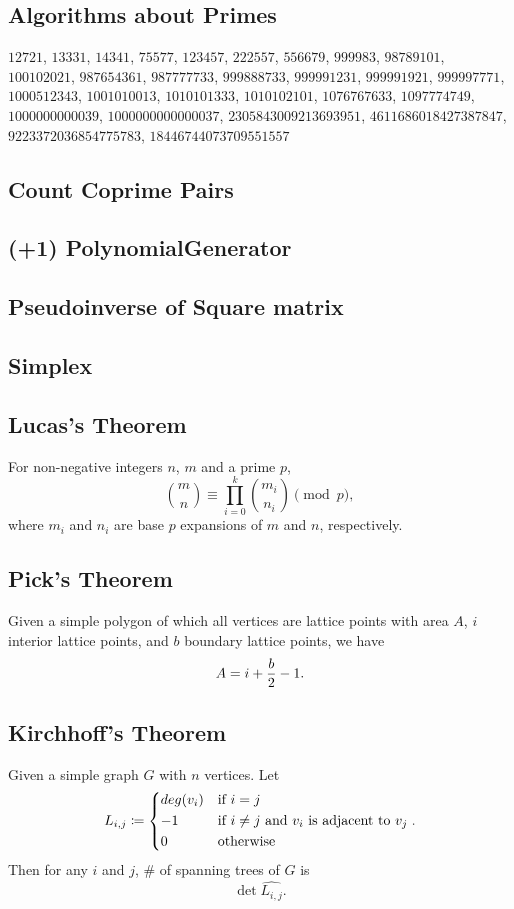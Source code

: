 \documentclass[a4paper,10pt,twocolumn,oneside]{article}
\begin{document}
\subsection{Algorithms about Primes}
$12721$,
$13331$,
$14341$,
$75577$,
$123457$,
$222557$,
$556679$,
$999983$,
$98789101$,
$100102021$,
$987654361$,
$987777733$,
$999888733$,
$999991231$,
$999991921$,
$999997771$,
$1000512343$,
$1001010013$,
$1010101333$,
$1010102101$,
$1076767633$,
$1097774749$,
$1000000000039$,
$1000000000000037$,
$2305843009213693951$,
$4611686018427387847$,
$9223372036854775783$,
$18446744073709551557$

\subsection{Count Coprime Pairs}

\subsection{(+1) PolynomialGenerator}

\subsection{Pseudoinverse of Square matrix}

\subsection{Simplex}


\subsection{Lucas's Theorem}
For non-negative integers $n$, $m$ and a prime $p$,
\[{m\choose n} \equiv \prod_{i=0}^{k}{m_i\choose n_i} \pmod{p},\]
where $m_i$ and $n_i$ are base $p$ expansions of $m$ and $n$, respectively.
\subsection{Pick's Theorem}
Given a simple polygon of which all vertices are lattice points
with area $A$, $i$ interior lattice points, and $b$ boundary lattice points,
we have \[A=i+{b\over2}-1.\]
\subsection{Kirchhoff's Theorem}
Given a simple graph $G$ with $n$ vertices.
Let \[L_{i,j} \coloneqq
\begin{dcases}
    deg(v_i) & \text{if } i = j \\
    -1 & \text{if } i \ne j \text{ and } v_i \text{ is adjacent to } v_j \\
    0 & \text{otherwise}
\end{dcases}.
\]
Then for any $i$ and $j$,
\# of spanning trees of $G$ is \[\det \widehat{L_{i,j}}.\]
\end{document}
